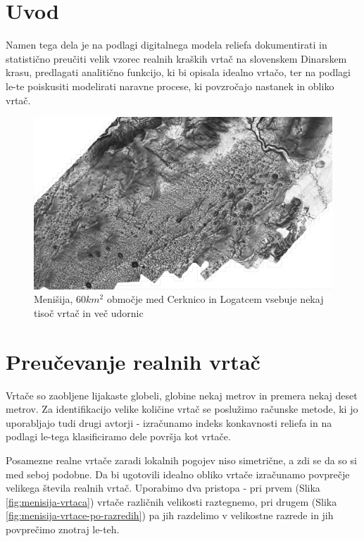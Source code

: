 \documentclass[a4paper, oneside, 12pt]{book}
\begin{document}
\mainmatter
\setcounter{page}{1}
\pagestyle{fancy}

\chapter{Uvod}
\label{ch1}
Namen tega dela je na podlagi digitalnega modela reliefa dokumentirati in statistično preučiti velik vzorec realnih kraških vrtač na slovenskem Dinarskem krasu, predlagati analitično funkcijo, ki bi opisala idealno vrtačo, ter na podlagi le-te poiskusiti modelirati naravne procese, ki povzročajo nastanek in obliko vrtač.

\begin{figure}[H]
  \centering
  \includegraphics[width=14cm]{slike/menisija-relief.png}
  \caption{Menišija, $60 km^2$ območje med Cerknico in Logatcem vsebuje nekaj tisoč vrtač in več udornic}
  \label{fig:menisija-relief}
\end{figure}

\chapter{Preučevanje realnih vrtač}

Vrtače so zaobljene lijakaste globeli, globine nekaj metrov in premera nekaj deset metrov. Za identifikacijo velike količine vrtač se poslužimo računske metode, ki jo uporabljajo tudi drugi avtorji \cite{doctor13} - izračunamo indeks konkavnosti reliefa in na podlagi le-tega klasificiramo dele površja kot vrtače.

Posamezne realne vrtače zaradi lokalnih pogojev niso simetrične, a zdi se da so si med seboj podobne. Da bi ugotovili idealno obliko vrtače izračunamo povprečje velikega števila realnih vrtač. Uporabimo dva pristopa - pri prvem (Slika \ref{fig:menisija-vrtaca}) vrtače različnih velikosti raztegnemo, pri drugem (Slika \ref{fig:menisija-vrtace-po-razredih}) pa jih razdelimo v velikostne razrede in jih povprečimo znotraj le-teh. 
\end{document}
